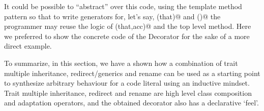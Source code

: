 It could be possible to ``abstract'' over this code, using the template method pattern so that
to write generators for, let's say, \Q@equals(that)@ and \Q@toS()@ the programmer may reuse the logic of \Q@fold(that,acc)@ and the top level method.
Here we preferred to show the concrete code of the Decorator \Q@Stringable@ for the sake of a more
direct example.

To summarize, in this section, we have a shown how a combination of
trait multiple inheritance, redirect/generics and rename
can be used as a starting point to synthesize arbitrary behaviour for a
code literal using an inductive mindset.
Trait multiple inheritance, redirect and rename
are high level class composition and adaptation operators,
and the obtained decorator also has a declarative `feel'.




